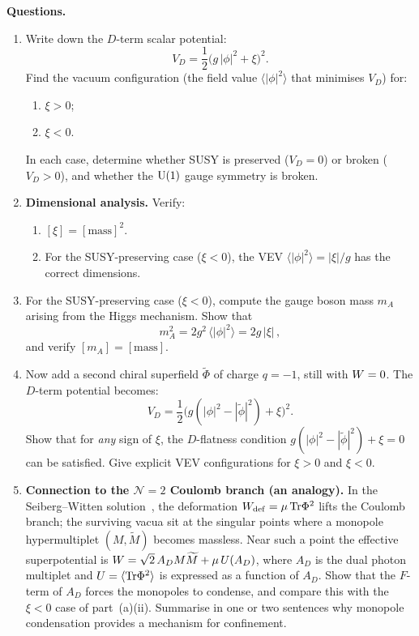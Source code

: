 \documentclass[11pt,a4paper]{article}
\begin{document}
\medskip

\noindent\textbf{Questions.}
\begin{enumerate}[label=(\alph*)]
  \item Write down the $D$-term scalar potential:
    \[
      V_D = \frac{1}{2}\bigl(g\,|\phi|^2 + \xi\bigr)^2.
    \]
    Find the vacuum configuration (the field value $\langle|\phi|^2
    \rangle$ that minimises $V_D$) for:
    \begin{enumerate}[label=(\roman*)]
      \item $\xi > 0$;
      \item $\xi < 0$.
    \end{enumerate}
    In each case, determine whether SUSY is preserved ($V_D = 0$) or
    broken ($V_D > 0$), and whether the $\mathrm{U}(1)$ gauge symmetry is
    broken.

  \item \textbf{Dimensional analysis.}  Verify:
    \begin{enumerate}[label=(\roman*)]
      \item $[\xi] = [\mathrm{mass}]^2$.
      \item For the SUSY-preserving case ($\xi < 0$), the VEV
        $\langle|\phi|^2\rangle = |\xi|/g$ has the correct dimensions.
    \end{enumerate}

  \item For the SUSY-preserving case ($\xi < 0$), compute the gauge
    boson mass $m_A$ arising from the Higgs mechanism.  Show that
    \[
      m_A^2 = 2g^2\,\langle|\phi|^2\rangle = 2g\,|\xi|\,,
    \]
    and verify $[m_A] = [\mathrm{mass}]$.

  \item Now add a second chiral superfield $\widetilde{\Phi}$ of charge
    $q = -1$, still with $W = 0$.  The $D$-term potential becomes:
    \[
      V_D = \frac{1}{2}\bigl(g(|\phi|^2 - |\tilde{\phi}|^2) + \xi
      \bigr)^2.
    \]
    Show that for \emph{any} sign of $\xi$, the $D$-flatness condition
    $g(|\phi|^2 - |\tilde\phi|^2) + \xi = 0$ can be satisfied.  Give
    explicit VEV configurations for $\xi > 0$ and $\xi < 0$.

  \item \textbf{Connection to the $\mathcal{N}=2$ Coulomb branch (an
    analogy).}  In the Seiberg--Witten solution~\cite{SW1994}, the
    deformation $W_{\mathrm{def}} = \mu\,\mathrm{Tr}\Phi^2$ lifts the
    Coulomb branch; the surviving vacua sit at the singular points where
    a monopole hypermultiplet $(M, \widetilde{M})$ becomes massless.
    Near such a point the effective superpotential is
    $W = \sqrt{2}\,A_D M\widetilde{M} + \mu\,U(A_D)$, where $A_D$
    is the dual photon multiplet and $U = \langle\mathrm{Tr}\Phi^2\rangle$ is
    expressed as a function of $A_D$.  Show that the $F$-term of $A_D$
    forces the monopoles to condense, and compare this with the
    $\xi < 0$ case of part~(a)(ii).  Summarise in one or two sentences
    why monopole condensation provides a mechanism for confinement.
\end{enumerate}
\end{document}
